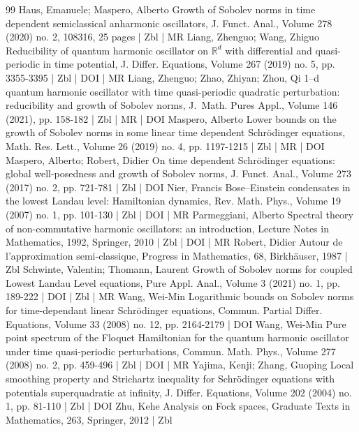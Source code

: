 \begin{thebibliography}{99}
Haus, Emanuele; Maspero, Alberto Growth of Sobolev norms in time dependent semiclassical anharmonic oscillators, J. Funct. Anal., Volume 278 (2020) no. 2, 108316, 25 pages | Zbl | MR
Liang, Zhenguo; Wang, Zhiguo Reducibility of quantum harmonic oscillator on ${\mathbb{R}}^d$ with differential and quasi-periodic in time potential, J. Differ. Equations, Volume 267 (2019) no. 5, pp. 3355-3395 | Zbl | DOI | MR
Liang, Zhenguo; Zhao, Zhiyan; Zhou, Qi 1--d quantum harmonic oscillator with time quasi-periodic quadratic perturbation: reducibility and growth of Sobolev norms, J. Math. Pures Appl., Volume 146 (2021), pp. 158-182 | Zbl | MR | DOI
Maspero, Alberto Lower bounds on the growth of Sobolev norms in some linear time dependent Schrödinger equations, Math. Res. Lett., Volume 26 (2019) no. 4, pp. 1197-1215 | Zbl | MR | DOI
Maspero, Alberto; Robert, Didier On time dependent Schrödinger equations: global well-posedness and growth of Sobolev norms, J. Funct. Anal., Volume 273 (2017) no. 2, pp. 721-781 | Zbl | DOI
Nier, Francis Bose–Einstein condensates in the lowest Landau level: Hamiltonian dynamics, Rev. Math. Phys., Volume 19 (2007) no. 1, pp. 101-130 | Zbl | DOI | MR
Parmeggiani, Alberto Spectral theory of non-commutative harmonic oscillators: an introduction, Lecture Notes in Mathematics, 1992, Springer, 2010 | Zbl | DOI | MR
Robert, Didier Autour de l’approximation semi-classique, Progress in Mathematics, 68, Birkhäuser, 1987 | Zbl
Schwinte, Valentin; Thomann, Laurent Growth of Sobolev norms for coupled Lowest Landau Level equations, Pure Appl. Anal., Volume 3 (2021) no. 1, pp. 189-222 | DOI | Zbl | MR
Wang, Wei-Min Logarithmic bounds on Sobolev norms for time-dependant linear Schrödinger equations, Commun. Partial Differ. Equations, Volume 33 (2008) no. 12, pp. 2164-2179 | DOI
Wang, Wei-Min Pure point spectrum of the Floquet Hamiltonian for the quantum harmonic oscillator under time quasi-periodic perturbations, Commun. Math. Phys., Volume 277 (2008) no. 2, pp. 459-496 | Zbl | DOI | MR
Yajima, Kenji; Zhang, Guoping Local smoothing property and Strichartz inequality for Schrödinger equations with potentials superquadratic at infinity, J. Differ. Equations, Volume 202 (2004) no. 1, pp. 81-110 | Zbl | DOI
Zhu, Kehe Analysis on Fock spaces, Graduate Texts in Mathematics, 263, Springer, 2012 | Zbl
\end{thebibliography}

